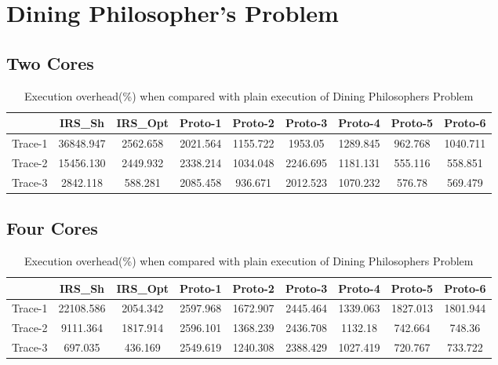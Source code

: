 \section{Dining Philosopher's Problem}

\subsection{Two Cores}
\begin{table}[h]
\begin{center}
 \begin{tabular}{|c c c c c c c c c|} 
 \hline
 & IRS\_Sh & IRS\_Opt& Proto-1 & Proto-2 & Proto-3 & Proto-4 & Proto-5 & Proto-6\\ %
 \hline
Trace-1 & 36848.947 & 2562.658 & 2021.564 & 1155.722 & 1953.05 & 1289.845 & 962.768 & 1040.711\\
Trace-2 & 15456.130 & 2449.932 & 2338.214 & 1034.048 & 2246.695 & 1181.131 & 555.116 & 558.851\\
Trace-3 & 2842.118 & 588.281 & 2085.458 & 936.671 & 2012.523 & 1070.232 & 576.78 & 569.479\\
\hline
\end{tabular}
\end{center}
\caption{Execution overhead(\%) when compared with plain execution of Dining Philosophers Problem}
\label{dining_phil_irs_res_cores_2}
\end{table}


\subsection{Four Cores}
\begin{table}[h]
\begin{center}
 \begin{tabular}{|c c c c c c c c c|} 
 \hline
 & IRS\_Sh & IRS\_Opt& Proto-1 & Proto-2 & Proto-3 & Proto-4 & Proto-5 & Proto-6\\ %
 \hline
Trace-1 & 22108.586 & 2054.342 & 2597.968 & 1672.907 & 2445.464 & 1339.063 & 1827.013 & 1801.944\\
Trace-2 & 9111.364 & 1817.914 & 2596.101 & 1368.239 & 2436.708 & 1132.18 & 742.664 & 748.36\\
Trace-3 & 697.035 & 436.169 & 2549.619 & 1240.308 & 2388.429 & 1027.419 & 720.767 & 733.722\\
\hline
\end{tabular}
\end{center}
\caption{Execution overhead(\%) when compared with plain execution of Dining Philosophers Problem}
\label{dining_phil_irs_res_cores_4}
\end{table}

